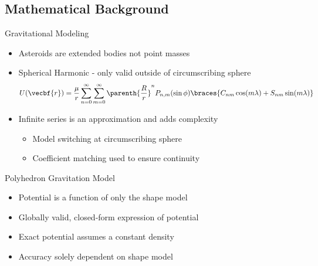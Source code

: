 \documentclass[11pt,professionalfonts]{beamer}
\begin{document}
\section*{}
\subsection*{Mathematical Background}
\begin{frame}{Gravitational Modeling} %

\begin{itemize}
  \item Asteroids are extended bodies not point masses
  \pause
  \item Spherical Harmonic - only valid outside of circumscribing sphere
    {
    \small
    \begin{align*}
      U(\vecbf{r} ) = \frac{\mu}{r} \sum_{n=0}^\infty \sum_{m=0}^\infty \parenth{\frac{R}{r}}^nP_{n,m}(\sin \phi) \braces{ C_{nm} \cos(m \lambda) + S_{nm} \sin(m \lambda)} 
    \end{align*}
    }
    \pause
  \item Infinite series is an approximation and adds complexity
    \begin{itemize}
        \item Model switching at circumscribing sphere
        \item Coefficient matching used to ensure continuity 
    \end{itemize}
\end{itemize}


\end{frame}   %


\begin{frame}{Polyhedron Gravitation Model}

\begin{itemize}
    \item Potential is a function of only the shape model
    \item Globally valid, closed-form expression of potential
    \item Exact potential assumes a constant density 
    \item Accuracy solely dependent on shape model
\end{itemize}

\end{frame}
\end{document}
